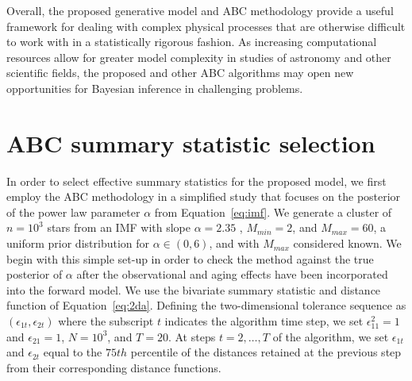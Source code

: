 \documentclass[12pt]{article}
\begin{document}
Overall, the proposed generative model and ABC methodology provide a useful framework for dealing with complex physical processes that are otherwise difficult to work with in a statistically rigorous fashion.
As increasing computational resources allow for greater model complexity in studies of astronomy and other scientific fields, the proposed and other ABC algorithms may open new opportunities for Bayesian inference in challenging problems. 

\appendix
\section{ABC summary statistic selection} \label{app:summary}
In order to select effective summary statistics for the proposed model, we first employ the ABC methodology in a simplified study that focuses on the posterior of the power law parameter $\alpha$ from Equation~\eqref{eq:imf}.  We generate a cluster of $n = 10^3$ stars from an IMF with slope $\alpha = 2.35$  \citep{salpeter55}, $M_{min} = 2$, and $M_{max} = 60$,  a uniform prior distribution for $\alpha \in (0, 6)$, and with $M_{max}$ considered known.  We begin with this simple set-up in order to check the method against the true posterior of $\alpha$ after the observational and aging effects have been incorporated into the forward model.  We use the bivariate summary statistic and distance function of Equation~\eqref{eq:2da}.  Defining the two-dimensional tolerance sequence as $(\epsilon_{1t}, \epsilon_{2t})$ where the subscript $t$ indicates the algorithm time step, we set $\epsilon_{11}^2 = 1$ and $\epsilon_{21} = 1$, $N = 10^3$, and $T = 20$.
At steps $t = 2,\ldots,T$ of the algorithm, we set $\epsilon_{1t}$ and $\epsilon_{2t}$ equal to the $75th$ percentile of the distances retained at the previous step from their corresponding distance functions.
\end{document}
